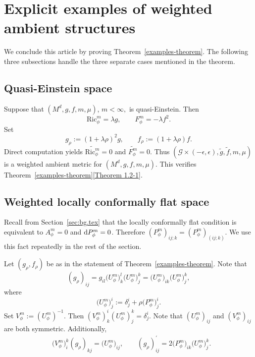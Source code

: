 \documentclass[10pt,a4paper]{amsart}
\numberwithin{equation}{section}
\begin{document}
\section{Explicit examples of weighted ambient structures}
\label{sec:explicit-examples}

We conclude this article by proving Theorem~\ref{examples-theorem}. The following three subsections handle the three separate cases mentioned in the theorem.



\subsection{Quasi-Einstein space}

Suppose that $(M^d,g,f,m,\mu)$, $m<\infty,$ is quasi-Einstein. Then
\begin{equation*}
\mathrm{Ric}_{\phi}^m=\lambda g,
\qquad F_\phi^m=-\lambda f^2.
\end{equation*}
Set
\begin{equation*}
g_\rho:=(1+\lambda \rho)^2 g,\qquad
f_\rho:=(1+\lambda\rho)f.
\end{equation*}
Direct computation yields $\widetilde{\mathrm{Ric}_\phi^m}=0$ and $\widetilde{F_\phi^m}=0$. Thus $(\mathcal{G}\times (-\epsilon,\epsilon),\widetilde{g},\widetilde{f},m,\mu)$ is a weighted ambient metric for $(M^d,g,f,m,\mu)$. This verifies Theorem~\ref{examples-theorem}\ref{Theorem 1.2-1}.


\subsection{Weighted locally conformally flat space}

Recall from Section~\ref{sec:bg.tex} that the locally conformally flat condition is equivalent to $A_\phi^m=0$ and ${\rm d}P_\phi^m=0$.
Therefore $(P_\phi^m)_{ij;k}=(P_\phi^m)_{(ij;k)}$. We use this fact repeatedly in the rest of the section.


Let $(g_\rho,f_\rho)$ be as in the statement of Theorem~\ref{examples-theorem}. Note that
\[
(g_\rho)_{i j}=g_{i l} \big(U_\phi^m\big)_{k}^{l} \big(U_\phi^m\big)_{j}^{k}=\big(U_\phi^m\big)_{i k} \big(U_\phi^m\big)_{j}^{k},
\]
where
\[
\big(U_\phi^m\big)_{j}^{i}:=\delta_{j}^{i}+ \rho\big(P_\phi^m\big)_{j}^{i}.
\]
Set $V_\phi^m:=(U_\phi^m)^{-1}$. Then $(V_\phi^m)_{k}^{i} (U_\phi^m)_{j}^{k}=\delta_{j}^{i}$. Note that $(U_\phi^m)_{i j}$ and $(V_\phi^m)_{i j}$ are both symmetric. Additionally,
\begin{align}
&\big(V_\phi^m\big)_{i}^{k} (g_\rho)_{k j}=\big(U_\phi^m\big)_{i j},\qquad
(g_\rho)_{i j}^{\prime}=2 \big(P_\phi^m\big)_{i k} \big(U_\phi^m\big)_{j}^{k}.\label{g'}
\end{align}
\end{document}
